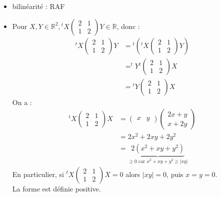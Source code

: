 \documentclass[../main.tex]{subfiles}
\begin{document}
\begin{itemize}
    \item bilinéarité : RAF
    \item Pour $X, Y\in \mathbb{R}^2, {^tX}\begin{pmatrix}
        2 & 1 \\
        1 & 2
    \end{pmatrix} Y\in \mathbb{R}$, donc : 
    \begin{align*}
        ^tX \begin{pmatrix}
            2 & 1 \\
            1 & 2
        \end{pmatrix} Y &= {^t \left( {^t}X \begin{pmatrix}
            2 & 1 \\
            1 & 2
        \end{pmatrix} Y \right)} \\
        &= ^tY {^t \begin{pmatrix}
            2 & 1 \\
            1 & 2
        \end{pmatrix}} X \\
        &= {^tY} \begin{pmatrix}
            2 & 1 \\
            1 & 2
        \end{pmatrix} X
    \end{align*}
    On a : 
    \begin{align*}
        {^tX} \begin{pmatrix}
            2 & 1 \\
            1 & 2
        \end{pmatrix} X &= \begin{pmatrix}
            x & y
        \end{pmatrix} \begin{pmatrix}
            2x + y \\
            x + 2y
        \end{pmatrix} \\
        &= 2x^2 + 2xy + 2y^2 \\
        &= \underbrace{2(x^2 + xy + y^2)}_{\geq 0 \text{ car } x^2 + xy + y^2 \geq |xy|}
    \end{align*}
    En particulier, si $^tX \begin{pmatrix}
        2 & 1 \\
        1 & 2
    \end{pmatrix} X = 0$ alors $|xy| = 0$, puis $x = y = 0$. \\
    La forme est définie positive. 
\end{itemize}
\end{document}
